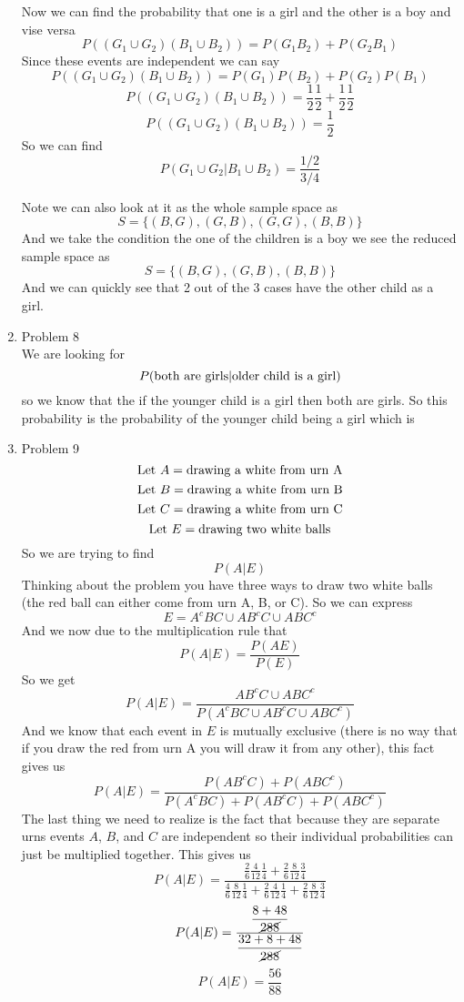 \documentclass[11pt]{article}
\begin{document}
\begin{enumerate}
Now we can find the probability that one is a girl and the other is a boy and vise versa
$$P((G_1\cup G_2)(B_1\cup B_2))=P(G_1B_2)+P(G_2B_1)$$ 
Since these events are independent we can say
$$P((G_1\cup G_2)(B_1\cup B_2))=P(G_1)P(B_2)+P(G_2)P(B_1)$$ 
$$P((G_1\cup G_2)(B_1\cup B_2))=\frac{1}{2}\frac{1}{2}+\frac{1}{2}\frac{1}{2}$$
$$P((G_1\cup G_2)(B_1\cup B_2))=\frac{1}{2}$$
So we can find 
$$P(G_1\cup G_2|B_1\cup B_2) = \frac{1/2}{3/4}$$
\begin{center}
\end{center}
Note we can also look at it as the whole sample space as
$$S = \{(B,G),(G,B),(G,G),(B,B)\}$$
And we take the condition the one of the children is a boy we see the reduced sample space as
$$S = \{(B,G),(G,B),(B,B)\}$$
And we can quickly see that 2 out of the 3 cases have the other child as a girl.


\item Problem 8\\
We are looking for
$$P(\textnormal{both are girls}|\textnormal{older child is a girl})$$
so we know that the if the younger child is a girl then both are girls. So this probability is the probability of the younger child being a girl which is 
\begin{center}
\end{center}

\item Problem 9\\
$$\textnormal{Let}\ A = \textnormal{drawing a white from urn A}$$
$$\textnormal{Let}\ B = \textnormal{drawing a white from urn B}$$
$$\textnormal{Let}\ C = \textnormal{drawing a white from urn C}$$
$$\textnormal{Let}\ E = \textnormal{drawing two white balls}$$
So we are trying to find $$P(A|E)$$
Thinking about the problem you have three ways to draw two white balls (the red ball can either come from urn A, B, or C). So we can express
$$E=A^cBC\cup AB^cC\cup ABC^c$$
And we now due to the multiplication rule that 
$$P(A|E) = \frac{P(AE)}{P(E)}$$
So we get 
$$P(A|E) = \frac{AB^cC\cup ABC^c}{P(A^cBC\cup AB^cC\cup ABC^c)}$$
And we know that each event in $E$ is mutually exclusive (there is no way that if you draw the red from urn A you will draw it from any other), this fact gives us 
$$P(A|E) = \frac{P(AB^cC)+ P(ABC^c)}{P(A^cBC)+P(AB^cC)+P(ABC^c)}$$
The last thing we need to realize is the fact that because they are separate urns events $A$, $B$, and $C$ are independent so their individual probabilities can just be multiplied together. This gives us
$$P(A|E) = \frac{\frac{2}{6}\frac{4}{12}\frac{1}{4}+\frac{2}{6}\frac{8}{12}\frac{3}{4}}{\frac{4}{6}\frac{8}{12}\frac{1}{4}+\frac{2}{6}\frac{4}{12}\frac{1}{4}+\frac{2}{6}\frac{8}{12}\frac{3}{4}}$$
$$P(A|E) = \frac{\dfrac{8+48}{\cancel{288}}}{\dfrac{32+8+48}{\cancel{288}}}$$
$$P(A|E) = \frac{56}{88}$$
\begin{center}
\end{center}


\end{enumerate}
\end{document}
